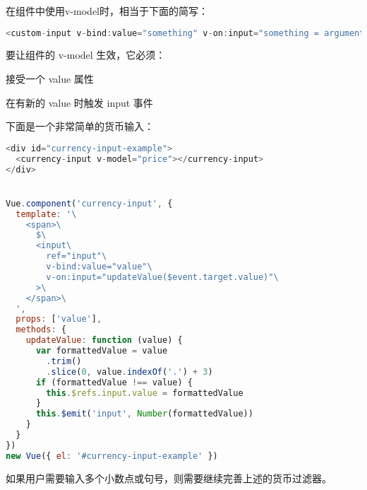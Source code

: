 在组件中使用v-model时，相当于下面的简写：

\begin{lstlisting}[language=JavaScript]
<custom-input v-bind:value="something" v-on:input="something = arguments[0]"></custom-input>
\end{lstlisting}

要让组件的 v-model 生效，它必须：

\begin{compactitem}
\item 接受一个 value 属性
\item 在有新的 value 时触发 input 事件
\end{compactitem}

下面是一个非常简单的货币输入：

\begin{lstlisting}[language=JavaScript]
<div id="currency-input-example">
  <currency-input v-model="price"></currency-input>
</div>


Vue.component('currency-input', {
  template: '\
    <span>\
      $\
      <input\
        ref="input"\
        v-bind:value="value"\
        v-on:input="updateValue($event.target.value)"\
      >\
    </span>\
  ',
  props: ['value'],
  methods: {
    updateValue: function (value) {
      var formattedValue = value
        .trim()
        .slice(0, value.indexOf('.') + 3)
      if (formattedValue !== value) {
        this.$refs.input.value = formattedValue
      }
      this.$emit('input', Number(formattedValue))
    }
  }
})
new Vue({ el: '#currency-input-example' })
\end{lstlisting}


如果用户需要输入多个小数点或句号，则需要继续完善上述的货币过滤器。


